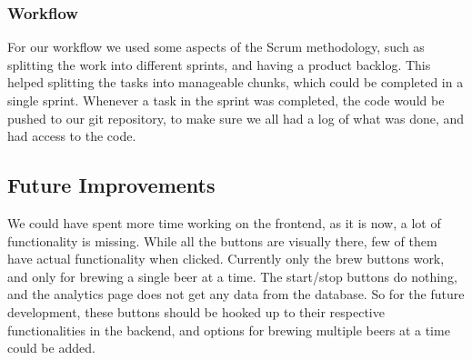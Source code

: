 \subsubsection{Workflow}
For our workflow we used some aspects of the Scrum methodology, such as splitting the work into different sprints, and having a product backlog.
This helped splitting the tasks into manageable chunks, which could be completed in a single sprint.
Whenever a task in the sprint was completed, the code would be pushed to our git repository,
to make sure we all had a log of what was done, and had access to the code.

\subsection{Future Improvements}
We could have spent more time working on the frontend, as it is now, a lot of functionality is missing. 
While all the buttons are visually there,
few of them have actual functionality when clicked. \newline
Currently only the brew buttons work, and only for brewing a single beer at a time.
The start/stop buttons do nothing, and the analytics page does not get any data from the database.
\newline
So for the future development, these buttons should be hooked up to their respective functionalities in the backend,
and options for brewing multiple beers at a time could be added.